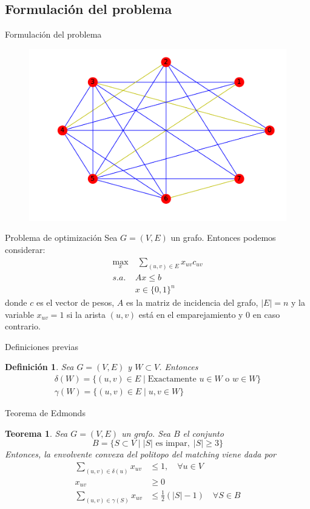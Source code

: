 \documentclass{beamer}
\newtheorem{defi}{Definici\'on}[section]
\newtheorem{thm}{Teorema}[section]
\begin{document}
\subsection{Formulación del problema}
\begin{frame}{Formulación del problema}
\begin{figure}[h!]
\includegraphics[scale=0.45]{opt2}
\end{figure}
\end{frame}

\begin{frame}{Problema de optimización}
Sea $G=(V,E)$ un grafo. Entonces podemos considerar:
\begin{align*}
\max_{x} &\; \sum_{(u,v)\in E} x_{uv}c_{uv}  \nonumber\\ 
s.a.\;  &  Ax\leq b \\
& x\in\{0,1\}^n\nonumber
\end{align*}
donde $c$ es el vector de pesos, $A$ es la matriz de incidencia del grafo, $|E|=n$ y la variable $x_{uv}=1$ si la arista $(u,v)$ está en el emparejamiento y $0$ en caso contrario.
\end{frame}

\begin{frame}{Definiciones previas}
\begin{defi}
Sea $G=(V,E)$ y $W\subset V$. Entonces 
\begin{gather*}
\delta(W) = \{(u,v)\in E \mid \text{Exactamente $u \in W$ o $w \in W$} \}\\
\gamma(W) = \{(u,v)\in E \mid u,v \in W\}
\end{gather*}
\end{defi}
\end{frame}
\begin{frame}{Teorema de Edmonds}
\begin{thm}
Sea $G=(V,E)$ un grafo. Sea $B$ el conjunto
$$
B = \{S\subset V \mid |S| \text{ es impar},\;|S|\geq 3\}
$$
Entonces, la envolvente convexa del politopo del matching viene dada por
\begin{align*}
\sum_{(u,v)\in\delta(u)} x_{uv} &\leq 1, \quad \forall u\in V\\
x_{uv} &\geq 0\\
\sum_{(u,v)\in \gamma(S)} x_{uv}& \leq \frac{1}{2}(|S|-1)\quad \forall S \in B	
\end{align*}
\end{thm}
\end{frame}
\end{document}
